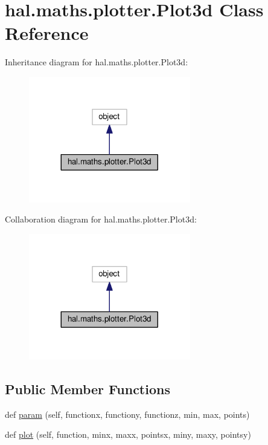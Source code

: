 \hypertarget{classhal_1_1maths_1_1plotter_1_1_plot3d}{}\section{hal.\+maths.\+plotter.\+Plot3d Class Reference}
\label{classhal_1_1maths_1_1plotter_1_1_plot3d}


Inheritance diagram for hal.\+maths.\+plotter.\+Plot3d\+:\nopagebreak
\begin{figure}[H]
\begin{center}
\leavevmode
\includegraphics[width=200pt]{classhal_1_1maths_1_1plotter_1_1_plot3d__inherit__graph}
\end{center}
\end{figure}


Collaboration diagram for hal.\+maths.\+plotter.\+Plot3d\+:\nopagebreak
\begin{figure}[H]
\begin{center}
\leavevmode
\includegraphics[width=200pt]{classhal_1_1maths_1_1plotter_1_1_plot3d__coll__graph}
\end{center}
\end{figure}
\subsection*{Public Member Functions}
\begin{DoxyCompactItemize}
\item 
def \hyperlink{classhal_1_1maths_1_1plotter_1_1_plot3d_ad17823fc8ceb91fa2c602c45f8eae70e}{param} (self, functionx, functiony, functionz, min, max, points)
\item 
def \hyperlink{classhal_1_1maths_1_1plotter_1_1_plot3d_a1e249de9ab5dac1acc94f82bada6deb0}{plot} (self, function, minx, maxx, pointsx, miny, maxy, pointsy)
\end{DoxyCompactItemize}
